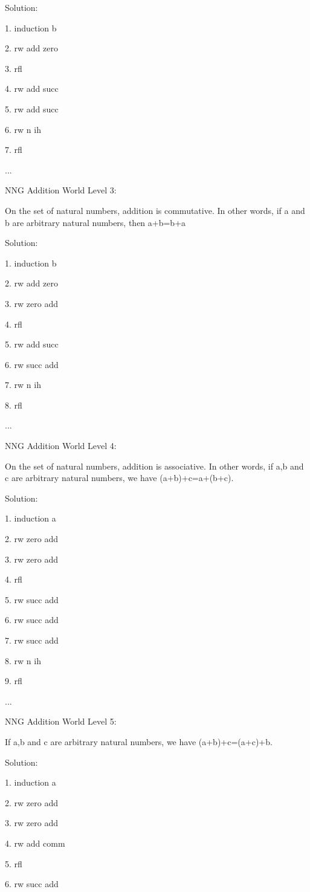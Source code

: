 \documentclass{article}
\theoremstyle{theorem}
\theoremstyle{definition}
\theoremstyle{remark}
\begin{document}
Solution: 

1. induction b

2. rw add zero

3. rfl

4. rw add succ

5. rw add succ

6. rw n ih

7. rfl

...

NNG Addition World Level 3:

On the set of natural numbers, addition is commutative. In other words, if a and b are arbitrary natural numbers, then a+b=b+a

Solution: 

1. induction b

2. rw add zero

3. rw zero add

4. rfl

5. rw add succ

6. rw succ add

7. rw n ih

8. rfl

...

NNG Addition World Level 4:

On the set of natural numbers, addition is associative. In other words, if a,b and c are arbitrary natural numbers, we have (a+b)+c=a+(b+c).

Solution: 

1. induction a

2. rw zero add

3. rw zero add

4. rfl

5. rw succ add

6. rw succ add

7. rw succ add

8. rw n ih

9. rfl

...

NNG Addition World Level 5:

If a,b and c are arbitrary natural numbers, we have (a+b)+c=(a+c)+b.

Solution: 

1. induction a

2. rw zero add

3. rw zero add

4. rw add comm

5. rfl

6. rw succ add
\end{document}
